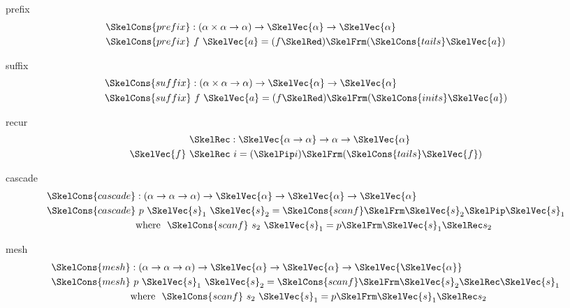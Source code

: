 \documentclass[preview]{standalone}
\begin{document}
\begin{docimage}{prefix}
  \begin{align*}%
    \SkelCons{prefix} &: (\alpha \times \alpha \rightarrow \alpha)
                        \rightarrow \SkelVec{\alpha} \rightarrow \SkelVec{\alpha} \\
    \SkelCons{prefix} &\ f\ \SkelVec{a}= (f \SkelRed) \SkelFrm (\SkelCons{tails} \SkelVec{a})
  \end{align*}
\end{docimage}

\begin{docimage}{suffix}
  \begin{align*}%
    \SkelCons{suffix} &: (\alpha \times \alpha \rightarrow \alpha)
                        \rightarrow \SkelVec{\alpha} \rightarrow \SkelVec{\alpha} \\
    \SkelCons{suffix} &\ f\ \SkelVec{a}= (f \SkelRed) \SkelFrm (\SkelCons{inits} \SkelVec{a})
  \end{align*}
\end{docimage}

\begin{docimage}{recur}
  \begin{align*}%
    \SkelRec &: \SkelVec{\alpha \rightarrow \alpha}
                          \rightarrow \alpha \rightarrow \SkelVec{\alpha} \\
    \SkelVec{f}\ \SkelRec &\ i = (\SkelPip i) \SkelFrm (\SkelCons{tails} \SkelVec{f})
  \end{align*}
\end{docimage}

\begin{docimage}{cascade}
\begin{align*}%
  \SkelCons{cascade} &: (\alpha \rightarrow \alpha \rightarrow \alpha)
                       \rightarrow \SkelVec{\alpha} \rightarrow \SkelVec{\alpha} \rightarrow \SkelVec{\alpha}\\
  \SkelCons{cascade} &\ p\ \SkelVec{s}_1\ \SkelVec{s}_2 = \SkelCons{scanf} \SkelFrm \SkelVec{s}_2 \SkelPip \SkelVec{s}_1 \\
                     &\text{where}\ \ \SkelCons{scanf}\ s_2\ \SkelVec{s}_1 = p \SkelFrm \SkelVec{s}_1 \SkelRec s_2 %
\end{align*}
\end{docimage}


\begin{docimage}{mesh}
\begin{align*}%
  \SkelCons{mesh} &: (\alpha \rightarrow \alpha \rightarrow \alpha)
                       \rightarrow \SkelVec{\alpha} \rightarrow \SkelVec{\alpha} \rightarrow \SkelVec{\SkelVec{\alpha}}\\
  \SkelCons{mesh} &\ p\ \SkelVec{s}_1\ \SkelVec{s}_2 = \SkelCons{scanf} \SkelFrm \SkelVec{s}_2 \SkelRec \SkelVec{s}_1 \\
                     &\text{where}\ \ \SkelCons{scanf}\ s_2\ \SkelVec{s}_1 = p \SkelFrm \SkelVec{s}_1 \SkelRec s_2 %
\end{align*}
\end{docimage}
\end{document}
